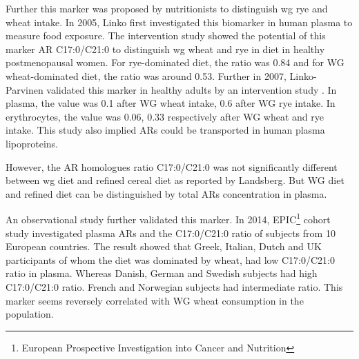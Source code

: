 Further this marker was proposed by nutritionists to distinguish \acrshort{wg} rye and wheat intake. In 2005, Linko\cite{ISI:000376712600013} first investigated this biomarker in human plasma to measure food exposure. The intervention study showed the potential of this marker AR C17:0/C21:0 to distinguish \acrshort{wg} wheat and rye in diet in healthy postmenopausal women. 
For rye-dominated diet, the ratio was 0.84 and for WG wheat-dominated diet, the ratio was around 0.53. 
Further in 2007, Linko-Parvinen validated this marker in healthy adults by an intervention study \cite{10.1093/jn/137.5.1137}.
In plasma, the value was 0.1 after WG wheat intake, 0.6 after WG rye intake. In erythrocytes, the value was 0.06, 0.33 respectively after WG wheat and rye intake. This study also implied ARs could be transported in human plasma lipoproteins.

However, the AR homologues ratio C17:0/C21:0 was not significantly different between \acrshort{wg} diet and refined cereal diet as reported by Landsberg\cite{ISI:000255012000007}. But WG diet and refined diet can be distinguished by total ARs concentration in plasma.

An observational study further validated this marker.
In 2014, EPIC\footnote{European Prospective Investigation into Cancer and Nutrition} cohort study investigated plasma ARs and the C17:0/C21:0 ratio of subjects from 10 European countries. 
The result showed that Greek, Italian, Dutch and UK participants of whom the diet was dominated by wheat, had low C17:0/C21:0 ratio in plasma. Whereas Danish, German and Swedish subjects had high C17:0/C21:0 ratio. French and Norwegian subjects had intermediate ratio. This marker seems reversely correlated with WG wheat consumption in the population.





